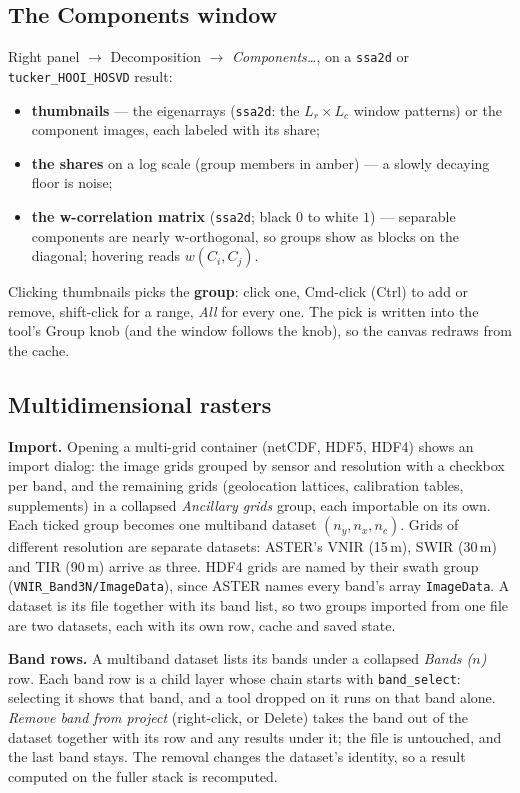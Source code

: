 \documentclass[10pt]{article}
\newcommand{\dev}[1]{\texttt{#1}}
\begin{document}
\subsection*{The Components window}
Right panel $\to$ Decomposition $\to$ \emph{Components\ldots}, on a \dev{ssa2d} or
\dev{tucker\_HOOI\_HOSVD} result:
\begin{itemize}\itemsep2pt
  \item \textbf{thumbnails} --- the eigenarrays (\dev{ssa2d}: the $L_r\times L_c$ window
        patterns) or the component images, each labeled with its share;
  \item \textbf{the shares} on a log scale (group members in amber) --- a slowly decaying
        floor is noise;
  \item \textbf{the w-correlation matrix} (\dev{ssa2d}; black $0$ to white $1$) ---
        separable components are nearly w-orthogonal, so groups show as blocks on the diagonal;
        hovering reads $w(C_i,C_j)$.
\end{itemize}
Clicking thumbnails picks the \textbf{group}: click one, Cmd-click (Ctrl) to add or remove,
shift-click for a range, \emph{All} for every one. The pick is written into the tool's Group
knob (and the window follows the knob), so the canvas redraws from the cache.

\subsection*{Multidimensional rasters}
\textbf{Import.} Opening a multi-grid container (netCDF, HDF5, HDF4) shows an import dialog:
the image grids grouped by sensor and resolution with a checkbox per band, and the remaining
grids (geolocation lattices, calibration tables, supplements) in a collapsed \emph{Ancillary
grids} group, each importable on its own. Each ticked group becomes one multiband dataset
$(n_y,n_x,n_c)$. Grids of different resolution are separate datasets: ASTER's VNIR (15\,m),
SWIR (30\,m) and TIR (90\,m) arrive as three. HDF4 grids are named by their swath group
(\texttt{VNIR\_Band3N/ImageData}), since ASTER names every band's array
\texttt{ImageData}. A dataset is its file together with its band list, so two groups
imported from one file are two datasets, each with its own row, cache and saved state.

\textbf{Band rows.} A multiband dataset lists its bands under a collapsed \emph{Bands ($n$)}
row. Each band row is a child layer whose chain starts with \dev{band\_select}: selecting it
shows that band, and a tool dropped on it runs on that band alone. \emph{Remove band from
project} (right-click, or Delete) takes the band out of the dataset together with its row
and any results under it; the file is untouched, and the last band stays. The removal
changes the dataset's identity, so a result computed on the fuller stack is recomputed.
\end{document}
